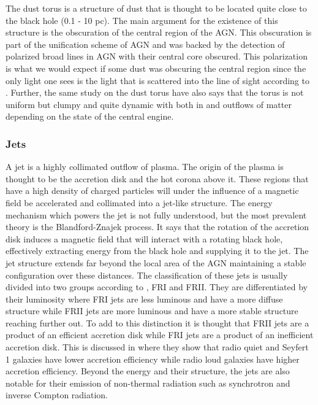 The dust torus is a structure of dust that is thought to be located quite close to the black hole (0.1 - 10 pc). The main argument for the existence of this structure is the obscuration of the central region of the AGN. This obscuration 
is part of the unification scheme of AGN and was backed by the detection of polarized broad lines in AGN with their central core obscured. This polarization is what we would expect if some dust was obscuring the central region since the only light one sees is 
the light that is scattered into the line of sight according to \cite{MASON201597}. Further, the same study on the dust torus have also says that the torus is not uniform but clumpy and quite dynamic with both in and outflows of matter depending on the state of the central engine. 





\subsubsection{Jets}
\label{sec:jets}

A jet is a highly collimated outflow of plasma. The origin of the plasma is thought to be the accretion disk and the hot corona above it. These regions that have a high density of charged particles will under the influence of a magnetic field be accelerated and collimated into a jet-like structure.
The energy mechanism which powers the jet is not fully understood, but the most prevalent theory is the Blandford-Znajek process. It says that the rotation of the accretion disk induces a magnetic field that will interact with a rotating black hole, effectively extracting energy from the black hole and supplying it to the jet. 
The jet structure extends far beyond the local area of the AGN maintaining a stable configuration over these distances. The classification of these jets is usually divided into two groups according to \cite{walg2013relativistic}, FRI and FRII. They are differentiated by their luminosity where FRI jets are less luminous and have a more diffuse structure while FRII jets are more luminous and have a more stable structure reaching further out.
To add to this distinction it is thought that FRII jets are a product of an efficient accretion disk while FRI jets are a product of an inefficient accretion disk. This is discussed in \cite{Wei-Hao_2003} where they show that radio quiet and Seyfert 1 galaxies have lower accretion efficiency while radio loud galaxies have higher accretion efficiency. 
Beyond the energy and their structure, the jets are also notable for their emission of non-thermal radiation such as synchrotron and inverse Compton radiation. %







